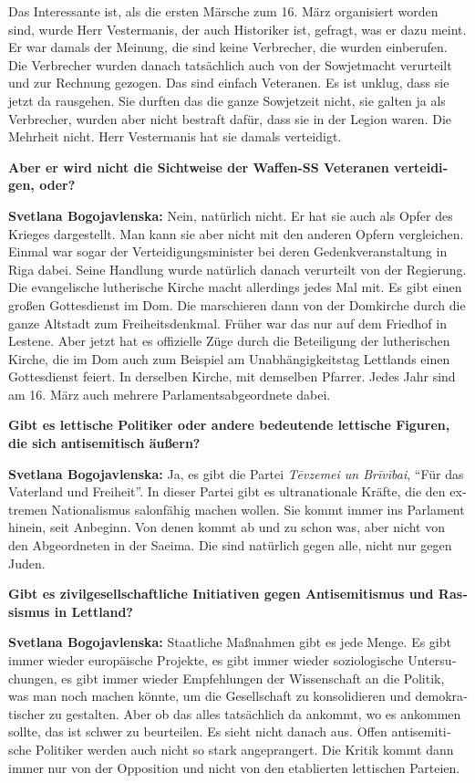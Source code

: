 \begin{otherlanguage}{ngerman}
Das Interessante ist, als die ersten Märsche zum 16. März organisiert worden sind, wurde Herr Vestermanis, der auch Historiker ist, gefragt, was er dazu meint. Er war damals der Meinung, die sind keine Verbrecher, die wurden einberufen. Die Verbrecher wurden danach tatsächlich auch von der Sowjetmacht verurteilt und zur Rechnung gezogen. Das sind einfach Veteranen. Es ist unklug, dass sie jetzt da rausgehen. Sie durften das die ganze Sowjetzeit nicht, sie galten ja als Verbrecher, wurden aber nicht bestraft dafür, dass sie in der Legion waren. Die Mehrheit nicht. Herr Vestermanis hat sie damals verteidigt.

\textbf{Aber er wird nicht die Sichtweise der Waffen-SS Veteranen verteidigen, oder?}

\textbf{Svetlana Bogojavlenska:} Nein, natürlich nicht. Er hat sie auch als Opfer des Krieges dargestellt. Man kann sie aber nicht mit den anderen Opfern vergleichen. Einmal war sogar der Verteidigungsminister bei deren Gedenkveranstaltung in Riga dabei. Seine Handlung wurde natürlich danach verurteilt von der Regierung. Die evangelische lutherische Kirche macht allerdings jedes Mal mit. Es gibt einen großen Gottesdienst im Dom. Die marschieren dann von der Domkirche durch die ganze Altstadt zum Freiheitsdenkmal. Früher war das nur auf dem Friedhof in Lestene. Aber jetzt hat es offizielle Züge durch die Beteiligung der lutherischen Kirche, die im Dom auch zum Beispiel am Unabhängigkeitstag Lettlands einen Gottesdienst feiert. In derselben Kirche, mit demselben Pfarrer. Jedes Jahr sind am 16. März auch mehrere Parlamentsabgeordnete dabei.

\textbf{Gibt es lettische Politiker oder andere bedeutende lettische Figuren, die sich antisemitisch äußern?}

\textbf{Svetlana Bogojavlenska:}  Ja, es gibt die Partei \textit{Tēvzemei un Brīvībai}, "`Für das Vaterland und Freiheit"'. In dieser Partei gibt es ultranationale Kräfte, die den extremen Nationalismus salonfähig machen wollen. Sie kommt immer ins Parlament hinein, seit Anbeginn. Von denen kommt ab und zu schon was, aber nicht von den Abgeordneten in der Saeima. Die sind natürlich gegen alle, nicht nur gegen Juden.

\textbf{Gibt es zivilgesellschaftliche Initiativen gegen Antisemitismus und Rassismus in Lettland?}

\textbf{Svetlana Bogojavlenska:}  Staatliche Maßnahmen gibt es jede Menge. Es gibt immer wieder europäische Projekte, es gibt immer wieder soziologische Untersuchungen, es gibt immer wieder Empfehlungen der Wissenschaft an die Politik, was man noch machen könnte, um die Gesellschaft zu konsolidieren und demokratischer zu gestalten. Aber ob das alles tatsächlich da ankommt, wo es ankommen sollte, das ist schwer zu beurteilen. Es sieht nicht danach aus. Offen antisemitische Politiker werden auch nicht so stark angeprangert. Die Kritik kommt dann immer nur von der Opposition und nicht von den etablierten lettischen Parteien.


\end{otherlanguage}
